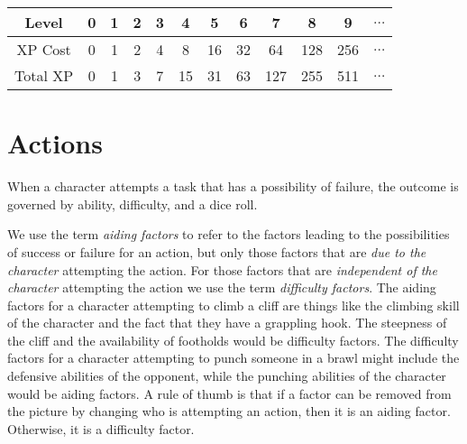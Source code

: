\begin{center}
\begin{tabular}{|c|c|c|c|c|c|c|c|c|c|c|c|}
\hline
Level    & 0 & 1 & 2 & 3 & 4  & 5  & 6  & 7   & 8   & 9   & $\ldots$ \\ \hline
XP Cost  & 0 & 1 & 2 & 4 & 8  & 16 & 32 & 64  & 128 & 256 & $\ldots$ \\ \hline
Total XP & 0 & 1 & 3 & 7 & 15 & 31 & 63 & 127 & 255 & 511 & $\ldots$ \\ \hline
\end{tabular}
\end{center}


\section{Actions}
When a character attempts a task that has a possibility of failure, the outcome is governed by ability, difficulty, and a dice roll. 

We use the term \emph{aiding factors} to refer to the factors leading to the possibilities of success or failure for an action,
but only those factors that are \emph{due to the character} attempting the action.
For those factors that are \emph{independent of the character} attempting the action we use the term \emph{difficulty factors}.
The aiding factors for a character attempting to climb a cliff are things like the climbing skill of the character and the fact that they have a grappling hook.
The steepness of the cliff and the availability of footholds would be difficulty factors.
The difficulty factors for a character attempting to punch someone in a brawl might include the defensive abilities of the opponent,
while the punching abilities of the character would be aiding factors.
A rule of thumb is that if a factor can be removed from the picture by changing who is attempting an action, then it is an aiding factor.
Otherwise, it is a difficulty factor.

